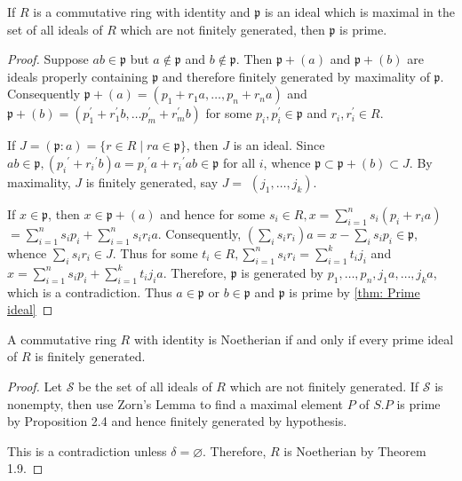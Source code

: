 \begin{proposition}
    If $R$ is a commutative ring with identity and $\mathfrak{p}$ is an ideal which is maximal in the set of all ideals of $R$ which are not finitely generated, then $\mathfrak{p}$ is prime.

    \begin{proof}
        Suppose $a b \in \mathfrak{p}$ but $a \notin \mathfrak{p}$ and $b \notin \mathfrak{p}$. Then $\mathfrak{p}+(a)$ and $\mathfrak{p}+(b)$ are ideals properly containing $\mathfrak{p}$ and therefore finitely generated by maximality of $\mathfrak{p}$. Consequently $\mathfrak{p}+(a)=\left(p_1+r_1 a, \ldots, p_n+r_n a\right)$
        and
        $\mathfrak{p}+(b)=\left(p_1^{\prime}+r_1^{\prime} b, \ldots p_m^{\prime}+r_m^{\prime} b\right)$ for some $p_i, p_i^{\prime} \in \mathfrak{p}$ and $r_i, r_i^{\prime} \in R$.

        If $J=\left(\mathfrak{p}:a\right)=\{r \in R \mid r a \in \mathfrak{p}\}$, then $J$ is an ideal. Since $a b \in \mathfrak{p},\left(p_i{ }^{\prime}+r_i{ }^{\prime} b\right) a=p_i{ }^{\prime} a+r_i{ }^{\prime} a b \in \mathfrak{p}$ for all $i$, whence $\mathfrak{p} \subset\mathfrak{p}+(b) \subset J$. By maximality, $J$ is finitely generated, say $J=$ $\left(j_1, \ldots, j_k\right)$.

        If $x \in \mathfrak{p}$, then $x \in \mathfrak{p}+(a)$ and hence for some $s_i \in R, x=\sum_{i=1}^n s_i\left(p_i+r_i a\right)$ $=\sum_{i=1}^n s_i p_i+\sum_{i=1}^n s_i r_i a$. Consequently, $\left(\sum_i s_i r_i\right) a=x-\sum_i s_i p_i \in \mathfrak{p}$, whence $\sum_i s_i r_i \in J$. Thus for some $t_i \in R, \sum_{i=1}^n s_i r_i=\sum_{i=1}^k t_i j_i$ and $x=\sum_{i=1}^n s_i p_i+\sum_{i=1}^k t_i j_i a$. Therefore, $\mathfrak{p}$ is generated by $p_1, \ldots, p_n, j_1 a, \ldots, j_k a$, which is a contradiction. Thus $a \in \mathfrak{p}$ or $b \in \mathfrak{p}$ and $\mathfrak{p}$ is prime by
        \ref{thm: Prime ideal}
    \end{proof}
\end{proposition}


\begin{theorem} [I.S.Cohen]
    A commutative ring $R$ with identity is Noetherian if and only if every prime ideal of $R$ is finitely generated.

    \begin{proof}
        Let $\mathcal{S}$ be the set of all ideals of $R$ which are not finitely generated.
        If $\mathcal{S}$ is nonempty, then use Zorn's Lemma to find a maximal element $P$ of $S . P$ is prime by Proposition 2.4 and hence finitely generated by hypothesis.

        This is a contradiction unless $\delta=\varnothing$. Therefore, $R$ is Noetherian by Theorem 1.9.
    \end{proof}
\end{theorem}



